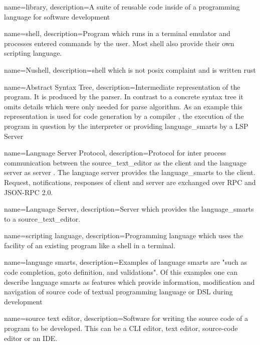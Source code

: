 
{
    name={library},
    description={A suite of reusable code inside of a programming language for software development}
}

{
    name={shell},
    description={Program which runs in a terminal emulator and processes entered commands by the user. 
    Most shell also provide their own scripting language.}
}

{
    name={Nushell},
    description={\gls{shell} which is not posix complaint and is written rust} 
}

{
    name={Abstract Syntax Tree},
    description={Intermediate representation of the program. It is produced by the parser.
    In contrast to a concrete syntax tree it omits details which were only needed for parse algorithm.
    As an example this representation is used for code generation by a compiler
    , the execution of the program in question by the interpreter or providing \gls{language_smarts} by a LSP Server}
}

{
    name={Language Server Protocol},
    description={Protocol for inter process communication between the \gls{source_text_editor} as the client and the language server as server \cite{LSP_what_is_it}.
    The language server provides the \gls{language_smarts} to the client. Request, notifications, responses of client and server are exchanged over RPC and JSON-RPC 2.0.} 
}

{
    name={Language Server},
    description={Server which provides the \gls{language_smarts} to a \gls{source_text_editor}}.
}

{
    name={scripting language},
    description={Programming language which uses the facility of an existing program like a shell in a terminal.}
}

{
    name={language smarts},
    description={Examples of language smarts are "such as code completion, goto definition, and validations"\cite{bunder2019decoupling}. 
    Of this examples one can describe language smarts as features 
    which provide information, modification and navigation of source code of textual programming language or DSL during development}
}

{
    name={source text editor},
    description={Software for writing the source code of a program to be developed. 
                 This can be a CLI editor, text editor, source-code editor or an IDE.}
}


\glsaddall
